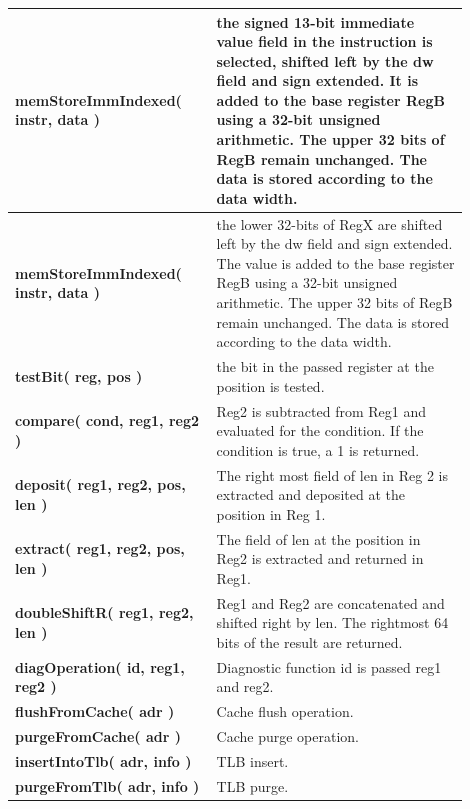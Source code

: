 \begin{center}
\begin{longtable}{@{}p{0.4\linewidth}p{0.5\linewidth}@{}}
    \midrule
    \textbf{ memStoreImmIndexed( instr, data )} & the signed 13-bit immediate value field in the instruction is selected, shifted left by the dw field and sign extended. It is added to the base register RegB using a 32-bit unsigned arithmetic. The upper 32 bits of RegB remain unchanged. The data is stored according to the data width. \\
    \midrule
    \textbf{memStoreImmIndexed( instr, data )} & the lower 32-bits of RegX are shifted left by the dw field and sign extended. The value is added to the base register RegB using a 32-bit unsigned arithmetic. The upper 32 bits of RegB remain unchanged. The data is stored according to the data width.\\
    \midrule
    \textbf{testBit( reg, pos ) } & the bit in the passed register at the position is tested. \\
    \midrule
    \textbf{compare( cond, reg1, reg2 ) } & Reg2 is subtracted from Reg1 and evaluated for the condition. If the condition is true, a 1 is returned. \\
    \midrule
    \textbf{deposit( reg1, reg2, pos, len ) } & The right most field of len in Reg 2 is extracted and deposited at the position in Reg 1. \\
    \midrule
    \textbf{extract( reg1, reg2, pos, len ) } & The field of len at the position in Reg2 is extracted and returned in Reg1. \\
    \midrule
    \textbf{doubleShiftR( reg1, reg2, len ) } & Reg1 and Reg2 are concatenated and shifted right by len. The rightmost 64 bits of the result are returned. \\
    \midrule
    \textbf{diagOperation( id, reg1, reg2 ) } & Diagnostic function id is passed reg1 and reg2. \\
    \midrule
    \textbf{flushFromCache( adr ) } & Cache flush operation. \\
    \midrule
    \textbf{purgeFromCache( adr ) } & Cache purge operation. \\
    \midrule
    \textbf{insertIntoTlb( adr, info ) } & TLB insert. \\
    \midrule
    \textbf{purgeFromTlb( adr, info ) } & TLB purge. \\
    \midrule
\end{longtable}
\end{center}
